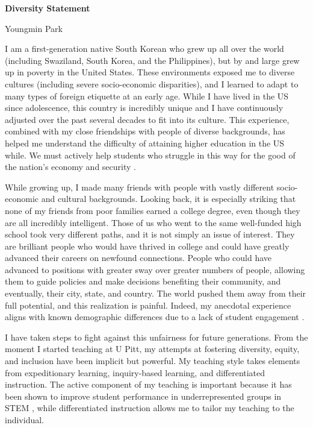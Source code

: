 \documentclass[a4paper,11pt]{article}
\begin{document}
	
	\begin{center}
		\Large \textbf{Diversity Statement}
		
		\Large Youngmin Park
	\end{center}
	
	I am a first-generation native South Korean who grew up all over the world (including Swaziland, South Korea, and the Philippines), but by and large grew up in poverty in the United States. These environments exposed me to diverse cultures (including severe socio-economic disparities), and I learned to adapt to many types of foreign etiquette at an early age. While I have lived in the US since adolescence, this country is incredibly unique and I have continuously adjusted over the past several decades to fit into its culture. This experience, combined with my close friendships with people of diverse backgrounds, has helped me understand the difficulty of attaining higher education in the US while. We must actively help students who struggle in this way for the good of the nation's economy and security \cite{jones2018call}.
	
	While growing up, I made many friends with people with vastly different socio-economic and cultural backgrounds. Looking back, it is especially striking that none of my friends from poor families earned a college degree, even though they are all incredibly intelligent. Those of us who went to the same well-funded high school took very different paths, and it is not simply an issue of interest. They are brilliant people who would have thrived in college and could have greatly advanced their careers on newfound connections. People who could have advanced to positions with greater sway over greater numbers of people, allowing them to guide policies and make decisions benefiting their community, and eventually, their city, state, and country. The world pushed them away from their full potential, and this realization is painful. Indeed, my anecdotal experience aligns with known demographic differences \cite{jones2018call} due to a lack of student engagement \cite{kokkelenberg2010succeeds,savaria2017critical}.
	
	I have taken steps to fight against this unfairness for future generations. From the moment I started teaching at U Pitt, my attempts at fostering diversity, equity, and inclusion have been implicit but powerful. My teaching style takes elements from expeditionary learning, inquiry-based learning, and differentiated instruction. The active component of my teaching is important because it has been shown to improve student performance in underrepresented groups in STEM \cite{theobald2020active}, while differentiated instruction allows me to tailor my teaching to the individual.
	
\end{document}
